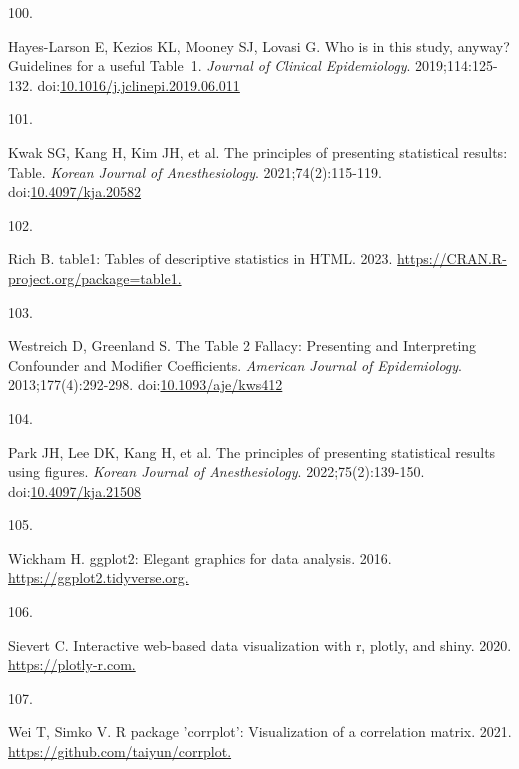 \documentclass[
]{book}
\newlength{\cslhangindent}
\newlength{\csllabelwidth}
\newlength{\cslentryspacingunit} %
\newenvironment{CSLReferences}[2] %
 {%
  \setlength{\parindent}{0pt}
  \ifodd #1
  \let\oldpar\par
  \def\par{\hangindent=\cslhangindent\oldpar}
  \fi
  \setlength{\parskip}{#2\cslentryspacingunit}
 }%
 {}
\newcommand{\CSLLeftMargin}[1]{\parbox[t]{\csllabelwidth}{#1}}
\newcommand{\CSLRightInline}[1]{\parbox[t]{\linewidth - \csllabelwidth}{#1}\break}
\begin{document}
\begin{CSLReferences}{0}{0}
\leavevmode{}%
\CSLLeftMargin{100. }%
\CSLRightInline{Hayes-Larson E, Kezios KL, Mooney SJ, Lovasi G. Who is in this study, anyway? Guidelines for a useful Table~1. \emph{Journal of Clinical Epidemiology}. 2019;114:125-132. doi:\href{https://doi.org/10.1016/j.jclinepi.2019.06.011}{10.1016/j.jclinepi.2019.06.011}}

\leavevmode{}%
\CSLLeftMargin{101. }%
\CSLRightInline{Kwak SG, Kang H, Kim JH, et al. The principles of presenting statistical results: Table. \emph{Korean Journal of Anesthesiology}. 2021;74(2):115-119. doi:\href{https://doi.org/10.4097/kja.20582}{10.4097/kja.20582}}

\leavevmode{}%
\CSLLeftMargin{102. }%
\CSLRightInline{Rich B. table1: Tables of descriptive statistics in HTML. 2023. \href{https://CRAN.R-project.org/package=table1}{https://CRAN.R-project.org/package=table1.}}

\leavevmode{}%
\CSLLeftMargin{103. }%
\CSLRightInline{Westreich D, Greenland S. The Table 2 Fallacy: Presenting and Interpreting Confounder and Modifier Coefficients. \emph{American Journal of Epidemiology}. 2013;177(4):292-298. doi:\href{https://doi.org/10.1093/aje/kws412}{10.1093/aje/kws412}}

\leavevmode{}%
\CSLLeftMargin{104. }%
\CSLRightInline{Park JH, Lee DK, Kang H, et al. The principles of presenting statistical results using figures. \emph{Korean Journal of Anesthesiology}. 2022;75(2):139-150. doi:\href{https://doi.org/10.4097/kja.21508}{10.4097/kja.21508}}

\leavevmode{}%
\CSLLeftMargin{105. }%
\CSLRightInline{Wickham H. ggplot2: Elegant graphics for data analysis. 2016. \href{https://ggplot2.tidyverse.org}{https://ggplot2.tidyverse.org.}}

\leavevmode{}%
\CSLLeftMargin{106. }%
\CSLRightInline{Sievert C. Interactive web-based data visualization with r, plotly, and shiny. 2020. \href{https://plotly-r.com}{https://plotly-r.com.}}

\leavevmode{}%
\CSLLeftMargin{107. }%
\CSLRightInline{Wei T, Simko V. R package 'corrplot': Visualization of a correlation matrix. 2021. \href{https://github.com/taiyun/corrplot}{https://github.com/taiyun/corrplot.}}


\end{CSLReferences}
\end{document}
